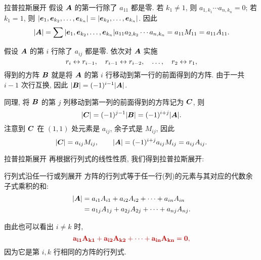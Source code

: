 \begin{frame}{拉普拉斯展开}
	\onslide<+->
	假设 ${\boldsymbol{A}}$ 的第一行除了 $a_{11}$ 都是零.
	\onslide<+->
	若 $k_1\neq 1$, 则 $a_{1,k_1}\cdots a_{n,k_n}=0$; 若 $k_1=1$, 则 $|{\boldsymbol{e}}_1,{\boldsymbol{e}}_{k_2},\dots,{\boldsymbol{e}}_{k_n}|=|{\boldsymbol{e}}_{k_2},\dots,{\boldsymbol{e}}_{k_n}|$.
	\onslide<+->
	因此
	\[|{\boldsymbol{A}}|=\sum |{\boldsymbol{e}}_1,{\boldsymbol{e}}_{k_2},\dots,{\boldsymbol{e}}_{k_n}|a_{11}a_{2,k_2}\cdots a_{n,k_n}=a_{11} M_{11}=a_{11} A_{11}.\]

	\onslide<+->
	假设 ${\boldsymbol{A}}$ 的第 $i$ 行除了 $a_{ij}$ 都是零.
	\onslide<+->
	依次对 ${\boldsymbol{A}}$ 实施
	\[r_i\leftrightarrow r_{i-1},\quad r_{i-1}\leftrightarrow r_{i-2},\quad\dots,\quad r_2\leftrightarrow r_1,\]
	得到的方阵 ${\boldsymbol{B}}$ 就是将 ${\boldsymbol{A}}$ 的第 $i$ 行移动到第一行的前面得到的方阵.
	\onslide<+->
	由于一共 $i-1$ 次行互换, 因此 $|{\boldsymbol{B}}|=(-1)^{i-1}|{\boldsymbol{A}}|$.

	\onslide<+->
	同理, 将 ${\boldsymbol{B}}$ 的第 $j$ 列移动到第一列的前面得到的方阵记为 ${\boldsymbol{C}}$, 则
	\[|{\boldsymbol{C}}|=(-1)^{j-1}|{\boldsymbol{B}}|=(-1)^{i+j}|{\boldsymbol{A}}|.\]
	\onslide<+->
	注意到 ${\boldsymbol{C}}$ 在 $(1,1)$ 处元素是 $a_{ij}$, 余子式是 $M_{ij}$,
	\onslide<+->
	因此
	\[|{\boldsymbol{C}}|=a_{ij}M_{ij},\qquad |{\boldsymbol{A}}|=(-1)^{i+j}a_{ij}M_{ij}=a_{ij}A_{ij}.\]
\end{frame}


\begin{frame}{拉普拉斯展开}
	\onslide<+->
	再根据行列式的线性性质, 我们得到拉普拉斯展开:
	\begin{second}{行列式沿任一行或列展开}
		方阵的行列式等于任一行(列)的元素与其对应的代数余子式乘积的和:
		\begin{align*}
			|{\boldsymbol{A}}|&=a_{i1}A_{i1}+a_{i2}A_{i2}+\cdots+a_{in}A_{in}\\
			&=a_{1j}A_{1j}+a_{2j}A_{2j}+\cdots+a_{nj}A_{nj}.
		\end{align*}
	\end{second}

	\onslide<+->
	由此也可以看出 \alert{$i\neq k$ 时,}
	\[\alert{a_{i1}A_{k1}+a_{i2}A_{k2}+\cdots+a_{in}A_{kn}=0,}\]
	\onslide<+->
	因为它是第 $i,k$ 行相同的方阵的行列式.
\end{frame}


